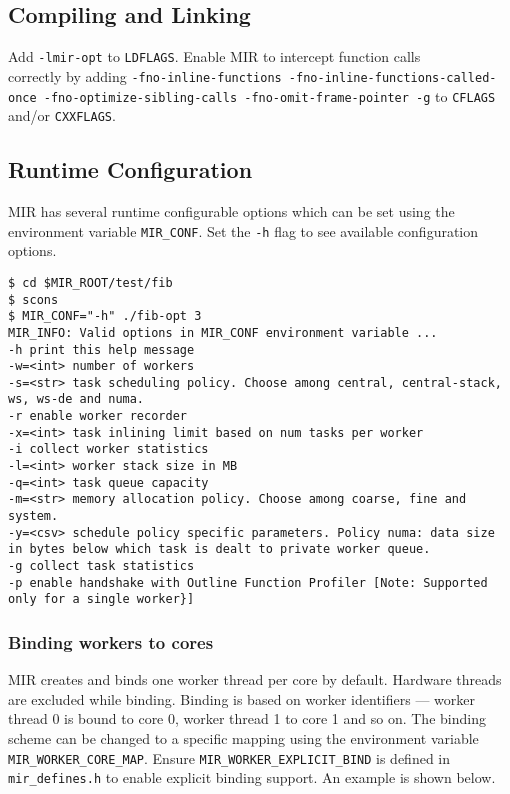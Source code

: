 \documentclass[11pt,a4paper]{article}
\begin{document}
\subsection{Compiling and Linking}\label{compiling-and-linking}

Add \texttt{-lmir-opt} to \texttt{LDFLAGS}. Enable MIR to intercept function calls\\correctly by adding \texttt{{\footnotesize -fno-inline-functions -fno-inline-functions-called-once -fno-optimize-sibling-calls -fno-omit-frame-pointer -g}}  to \texttt{CFLAGS} and/or \texttt{CXXFLAGS}.

\subsection{Runtime Configuration}\label{runtime-configuration}

MIR has several runtime configurable options which can be set using the environment variable \texttt{MIR\_CONF}. Set the \texttt{-h} flag to see available configuration options.

\begin{lstlisting}[style=MyInputStyle]
$ cd $MIR_ROOT/test/fib
$ scons
$ MIR_CONF="-h" ./fib-opt 3
MIR_INFO: Valid options in MIR_CONF environment variable ...
-h print this help message
-w=<int> number of workers
-s=<str> task scheduling policy. Choose among central, central-stack, ws, ws-de and numa.
-r enable worker recorder
-x=<int> task inlining limit based on num tasks per worker
-i collect worker statistics
-l=<int> worker stack size in MB
-q=<int> task queue capacity
-m=<str> memory allocation policy. Choose among coarse, fine and system.
-y=<csv> schedule policy specific parameters. Policy numa: data size in bytes below which task is dealt to private worker queue.
-g collect task statistics
-p enable handshake with Outline Function Profiler [Note: Supported only for a single worker}]
\end{lstlisting}

\subsubsection{Binding workers to cores}\label{binding-workers-to-cores}

MIR creates and binds one worker thread per core by default. Hardware threads are excluded while binding. Binding is based on worker identifiers --- worker thread 0 is bound to core 0, worker thread 1 to core 1 and so on. The binding scheme can be changed to a specific mapping using the environment variable \texttt{MIR\_WORKER\_CORE\_MAP}. Ensure \texttt{MIR\_WORKER\_EXPLICIT\_BIND} is defined in \texttt{mir\_defines.h} to enable explicit binding support. An example is shown below.
\end{document}
